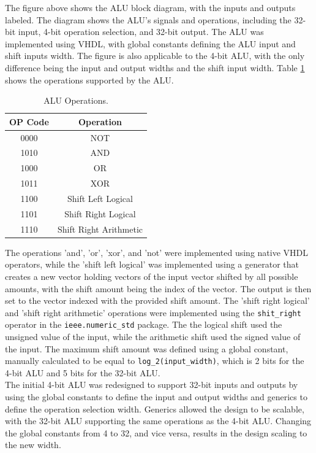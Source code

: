 \documentclass[CMPE]{../KGCOEReport}
\begin{document}
The figure above shows the ALU block diagram, with the inputs and outputs labeled. The diagram shows the ALU's signals and operations, including the 32-bit input, 4-bit operation selection, and 32-bit output. The ALU was implemented using VHDL, with global constants defining the ALU input and shift inputs width. The figure is also applicable to the 4-bit ALU, with the only difference being the input and output widths and the shift input width. Table \ref{tab:operations} shows the operations supported by the ALU.

\begin{table}[H]
    \centering
    \begin{tabular}{|c|c|}
        \hline
        \textbf{OP Code} & \textbf{Operation} \\
        \hline
        0000 & NOT \\
        1010 & AND \\
        1000 & OR \\
        1011 & XOR \\
        1100 & Shift Left Logical \\
        1101 & Shift Right Logical \\
        1110 & Shift Right Arithmetic \\
        \hline
    \end{tabular}
    \caption{ALU Operations.}
    \label{tab:operations}
\end{table}

The operations 'and', 'or', 'xor', and 'not' were implemented using native VHDL operators, while the 'shift left logical' was implemented using a generator that creates a new vector holding vectors of the input vector shifted by all possible amounts, with the shift amount being the index of the vector. The output is then set to the vector indexed with the provided shift amount. The 'shift right logical' and 'shift right arithmetic' operations were implemented using the \verb|shit_right| operator in the \verb|ieee.numeric_std| package. The the logical shift used the unsigned value of the input, while the arithmetic shift used the signed value of the input. The maximum shift amount was defined using a global constant, manually calculated to be equal to \verb|log_2(input_width)|, which is 2 bits for the 4-bit ALU and 5 bits for the 32-bit ALU.\\

The initial 4-bit ALU was redesigned to support 32-bit inputs and outputs by using the global constants to define the input and output widths and generics to define the operation selection width. Generics allowed the design to be scalable, with the 32-bit ALU supporting the same operations as the 4-bit ALU. Changing the global constants from 4 to 32, and vice versa, results in the design scaling to the new width.
\end{document}
